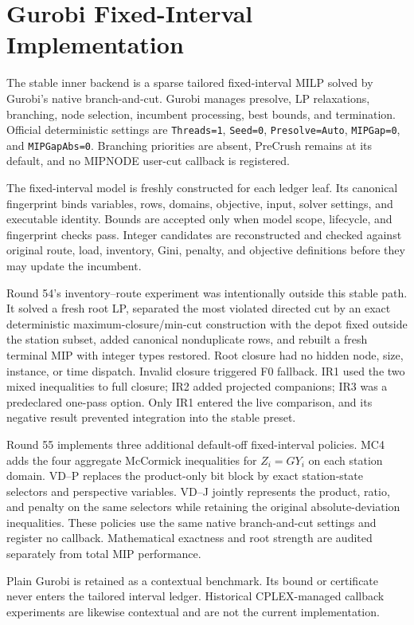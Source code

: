 \section{Gurobi Fixed-Interval Implementation}
The stable inner backend is a sparse tailored fixed-interval MILP solved by
Gurobi's native branch-and-cut. Gurobi manages presolve, LP relaxations,
branching, node selection, incumbent processing, best bounds, and termination.
Official deterministic settings are \texttt{Threads=1}, \texttt{Seed=0},
\texttt{Presolve=Auto}, \texttt{MIPGap=0}, and \texttt{MIPGapAbs=0}.
Branching priorities are absent, PreCrush remains at its default, and no
MIPNODE user-cut callback is registered.

The fixed-interval model is freshly constructed for each ledger leaf. Its
canonical fingerprint binds variables, rows, domains, objective, input, solver
settings, and executable identity. Bounds are accepted only when model scope,
lifecycle, and fingerprint checks pass. Integer candidates are reconstructed
and checked against original route, load, inventory, Gini, penalty, and
objective definitions before they may update the incumbent.

Round 54's inventory--route experiment was intentionally outside this stable
path. It solved a fresh root LP, separated the most violated directed cut by an
exact deterministic maximum-closure/min-cut construction with the depot fixed
outside the station subset, added canonical nonduplicate rows, and rebuilt a
fresh terminal MIP with integer types restored. Root closure had no hidden
node, size, instance, or time dispatch. Invalid closure triggered F0 fallback.
IR1 used the two mixed inequalities to full closure; IR2 added projected
companions; IR3 was a predeclared one-pass option. Only IR1 entered the live
comparison, and its negative result prevented integration into the stable
preset.

Round 55 implements three additional default-off fixed-interval policies.
MC4 adds the four aggregate McCormick inequalities for $Z_i=G Y_i$ on each
station domain. VD--P replaces the product-only bit block by exact
station-state selectors and perspective variables. VD--J jointly represents
the product, ratio, and penalty on the same selectors while retaining the
original absolute-deviation inequalities. These policies use the same native
branch-and-cut settings and register no callback. Mathematical exactness and
root strength are audited separately from total MIP performance.

Plain Gurobi is retained as a contextual benchmark. Its bound or certificate
never enters the tailored interval ledger. Historical CPLEX-managed callback
experiments are likewise contextual and are not the current implementation.
